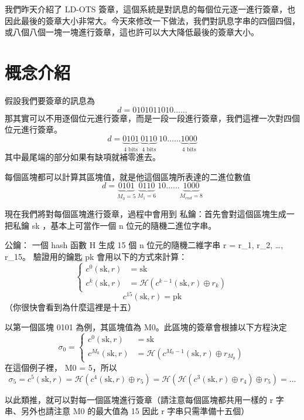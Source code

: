 \documentclass[
]{article}
\author{}
\date{}
\begin{document}
我們昨天介紹了 LD-OTS
簽章，這個系統是對訊息的每個位元逐一進行簽章，也因此最後的簽章大小非常大。今天來修改一下做法，我們對訊息字串的四個四個，或八個八個一塊一塊進行簽章，這也許可以大大降低最後的簽章大小。

\hypertarget{ux6982ux5ff5ux4ecbux7d39}{%
\section{概念介紹}\label{ux6982ux5ff5ux4ecbux7d39}}

假設我們要簽章的訊息為 \[
d = 0101011010\dots\dots 
\]
那其實可以不用逐個位元進行簽章，而是一段一段進行簽章，我們這裡一次對四個位元進行簽章。
\[
d = \underbrace{ 0101 }_{ \text{4 bits}}\ \underbrace{ 0110 }_{   \text{4 bits}}\ 10\dots\dots \underbrace{ 1000 }_{  \text{4 bits} }
\] 其中最尾端的部分如果有缺項就補零進去。

每個區塊都可以計算其區塊值，就是他這個區塊所表達的二進位數值 \[
d = \underbrace{ 0101 }_{ M_{0}=5 }\ \underbrace{ 0110 }_{ M_{1}=6 }\ 10\dots\dots \underbrace{ 1000 }_{ M_{end}=8 }
\]

現在我們將對每個區塊進行簽章，過程中會用到
私鑰：首先會對這個區塊生成一把私鑰 sk ，基本上可當作一個 n
位元的隨機二進位字串。

公鑰： 一個 hash 函數 H 生成 15 個 n 位元的隨機二維字串 r = r\_1, r\_2,
\ldots, r\_15。 驗證用的鑰匙 pk 會用以下的方式來計算： \[
\left\{\begin{aligned}
c^{0}(\mathrm{sk}, r) &= \mathrm{sk}\\
c^{k}(\mathrm{sk}, r) &= \mathcal{H}(c^{k-1}(\mathrm{sk},r) \oplus r_{k})
\end{aligned}\right.
\] \[
c^{15}(\mathrm{sk},r) = \mathrm{pk}
\] （你很快會看到為什麼這裡是十五）

以第一個區塊 0101 為例，其區塊值為 M0。此區塊的簽章會根據以下方程決定 \[
\sigma_{0} = \left\{\begin{aligned}
c^{0}(\mathrm{sk}, r) &= \mathrm{sk}\\
c^{M_{0}}(\mathrm{sk}, r) &= \mathcal{H}(c^{M_{0}-1}(\mathrm{sk},r) \oplus r_{M_{0}})
\end{aligned}\right.
\] 在這個例子裡， M0 = 5，所以 \[
\sigma_{5} = c^{5}(\mathrm{sk},r) = \mathcal{H}(c^{4}(\mathrm{sk},r)\oplus r_{5}) = \mathcal{H}(\mathcal{H}(c^{3}(\mathrm{sk},r)\oplus r_{4})\oplus r_{5}) = \dots
\]

以此類推，就可以對每一個區塊進行簽章（請注意每個區塊都共用一樣的 r
字串、另外也請注意 M0 的最大值為 15 因此 r 字串只需準備十五個）
\end{document}
